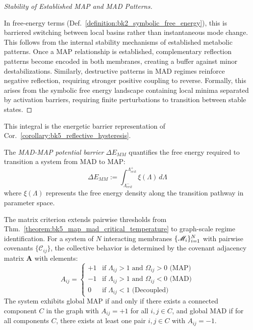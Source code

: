 \begin{proof}[Stability of Established MAP and MAD Patterns]
\label{proof:bk5_stability_map_mad_patterns}
\leavevmode

In free-energy terms (Def.~\ref{definition:bk2_symbolic_free_energy}), this is barriered switching between local basins rather than instantaneous mode change.
This follows from the internal stability mechanisms of established metabolic patterns. Once a MAP relationship is established, complementary reflection patterns become encoded in both membranes, creating a buffer against minor destabilizations. Similarly, destructive patterns in MAD regimes reinforce negative reflection, requiring stronger positive coupling to reverse.
Formally, this arises from the symbolic free energy landscape containing local minima separated by activation barriers, requiring finite perturbations to transition between stable states.
\end{proof}
\begin{definition} \label{definition:bk5_mad_map_potential_barrie} 
This integral is the energetic barrier representation of Cor.~\ref{corollary:bk5_reflective_hysteresis}.

The \emph{MAD-MAP potential barrier} $\Delta E_{MM}$ quantifies the free energy required to transition a system from MAD to MAP:
\begin{equation}
\Delta E_{MM} := \int_{\Lambda_{crit}^-}^{\Lambda_{crit}^+} \xi(\Lambda) \, d\Lambda
\end{equation}
\noindent where $\xi(\Lambda)$ represents the free energy density along the transition pathway in parameter space.
\end{definition}
\begin{proposition} 
\label{proposition:bk5_multi_agent_map_mad_classification}
The matrix criterion extends pairwise thresholds from Thm.~\ref{theorem:bk5_map_mad_critical_temperature} to graph-scale regime identification.
For a system of $N$ interacting membranes $\{\mathscr{M}_i\}_{i=1}^N$ with pairwise covenants $\{\mathcal{C}_{ij}\}$, the collective behavior is determined by the covenant adjacency matrix $\mathbf{A}$ with elements:
\begin{equation}
A_{ij} = 
\begin{cases}
+1 & \text{if } \Lambda_{ij} > 1 \text{ and } \Omega_{ij} > 0 \text{ (MAP)} \\
-1 & \text{if } \Lambda_{ij} > 1 \text{ and } \Omega_{ij} < 0 \text{ (MAD)} \\
0 & \text{if } \Lambda_{ij} < 1 \text{ (Decoupled)}
\end{cases}
\end{equation}
The system exhibits global MAP if and only if there exists a connected component $C$ in the graph with $A_{ij} = +1$ for all $i,j \in C$, and global MAD if for all components $C$, there exists at least one pair $i,j \in C$ with $A_{ij} = -1$.
\end{proposition}
